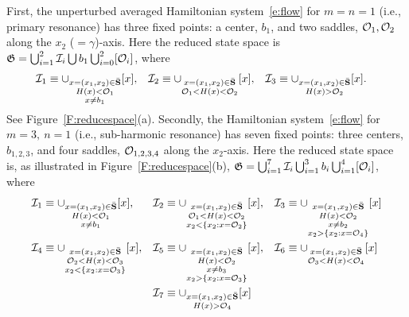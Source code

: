 First, the unperturbed averaged Hamiltonian system~\eqref{e:flow} for $m = n = 1$ (i.e., primary resonance) has three fixed points: a center, $b_1$, and two saddles, $\mathcal O_1, \mathcal O_2$ along the $x_2$ ($=\gamma$)-axis. Here the reduced state space is $\mathfrak G = \bigcup_{i=1}^2 \mathcal I_i \bigcup b_1 \bigcup_{i=0}^2 [\mathcal O_i]$, where
\begin{align*}
\mathcal I_1 &\equiv \cup_{\substack{ x=(x_1,x_2) \in \bar {\mathbf S}\\
H(x) < \mathcal O_1\\
x \ne b_1}} [x],& \mathcal I_2 &\equiv \cup_{\substack{ x=(x_1,x_2) \in \bar {\mathbf S}\\
{\mathcal O}_1<H(x)<{\mathcal O}_2 }} [x],&
\mathcal I_3 &\equiv \cup_{\substack{ x=(x_1,x_2) \in \bar {\mathbf S}\\
H(x)>{\mathcal O}_2}}[x].
\end{align*}
See Figure~\ref{F:reducespace}(a). Secondly, the Hamiltonian system~\eqref{e:flow} for $m=3,\ n=1$ (i.e., sub-harmonic resonance) has seven fixed points: three centers, $b_{1,2,3}$, and four saddles, $\mathcal O_{1,2,3,4}$ along the $x_2$-axis. Here the reduced state space is, as illustrated in Figure~\ref{F:reducespace}(b), $\mathfrak G = \bigcup_{i=1}^7 \mathcal I_i \bigcup_{i=1}^3 b_i \bigcup_{i=1}^4 [\mathcal O_i]$, where
\begin{align*}
\mathcal I_1 &\equiv \cup_{\substack{x=(x_1,x_2) \in \bar {\mathbf S}\\
H(x)<{\mathcal O}_1\\
x \ne b_1}} [x], & \mathcal I_2 &\equiv \cup_{\substack{ x=(x_1,x_2) \in \bar {\mathbf S}\\
{\mathcal O}_1< H(x) < \mathcal O_2\\
x_2 < \{x_2: x = \mathcal O_2 \}}} [x], & \mathcal I_3 &\equiv \cup_{\substack{x=(x_1,x_2) \in \bar {\mathbf S}\\
H(x)<{\mathcal O}_2\\
x \ne b_2\\
x_2 > \{x_2: x = \mathcal O_4\}}} [x]\\
\mathcal I_4 &\equiv \cup_{\substack{ x=(x_1,x_2) \in \bar {\mathbf S}\\
\mathcal O_2 < H(x) < \mathcal O_3\\
x_2 < \{x_2:x = \mathcal O_3\}}} [x], & \mathcal I_5 &\equiv \cup_{\substack{ x = (x_1,x_2) \in \bar {\mathbf S}\\
H(x)<{\mathcal O}_2\\
x \ne b_3\\
x_2 > \{x_2:x = \mathcal O_3\}}} [x], & \mathcal I_6 &\equiv \cup_{\substack{x = (x_1,x_2) \in \bar {\mathbf S}\\
{\mathcal O}_3<H(x) < \mathcal O_4}} [x]\\
& &
\mathcal I_7 &\equiv \cup_{\substack{ x=(x_1,x_2) \in \bar {\mathbf S} \\
H(x)>{\mathcal O}_4}} [x]
\end{align*}
